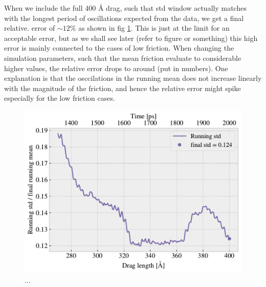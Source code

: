 When we include the full 400 Å drag, such that std window actually matches with the longest period of oscillations expected from the data, we get a final relative. error of $\sim 12 \%$ as shown in fig \ref{fig:runstd_long}. This is just at the limit for an acceptable error, but as we shall see later (refer to figure or something) this high error is mainly connected to the cases of low friction. When changing the simulation parameters, such that the mean friction evaluate to considerable higher values, the relative error drops to around (put in numbers). One explanation is that the osccilations in the running mean does not increase linearly with the magnitude of the friction, and hence the relative error might spike especially for the low friction cases. 


\begin{figure}[H]
  \centering
  \includegraphics[width=0.6\linewidth]{figures/baseline/Ff_runstd_long.pdf}
  \caption{...}
  \label{fig:runstd_long}
\end{figure}


